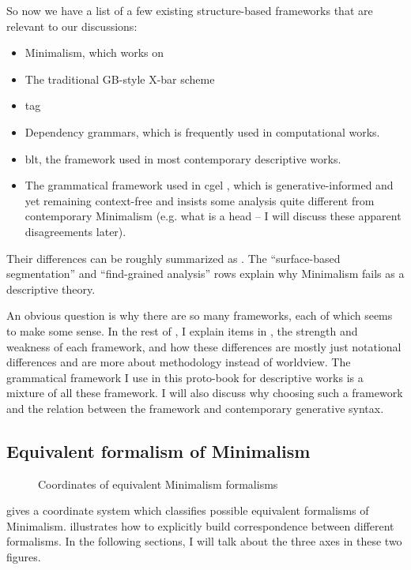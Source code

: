 \documentclass[../main.tex]{subfiles}
\begin{document}
So now we have a list of a few existing structure-based frameworks that are relevant to our discussions:
\begin{itemize}
    \item Minimalism, which works on 
    \item The traditional GB-style X-bar scheme
    \item \ac{tag}  %
    \item Dependency grammars, which is frequently used in computational works.
    \item \ac{blt}, the framework used in most contemporary descriptive works.
    \item The grammatical framework used in \ac{cgel} \citep{cgel,pullum2008expressive}, which is generative-informed and yet remaining 
    context-free and insists some analysis quite different from contemporary Minimalism (e.g. 
    what is a head -- I will discuss these apparent disagreements later).
\end{itemize}
Their differences can be roughly summarized as . 
The ``surface-based segmentation'' and ``find-grained analysis'' rows explain why Minimalism fails as a 
descriptive theory. 

An obvious question is why there are so many frameworks, each of which seems to make some sense. 
In the rest of , I explain items in , the strength and weakness 
of each framework, and how these differences
are mostly just notational differences and are more about methodology instead of worldview. The grammatical framework I use in this proto-book for 
descriptive works is a mixture of all these framework. I will also discuss why choosing such a 
framework and the relation between the framework and contemporary generative syntax.



\subsection{Equivalent formalism of Minimalism}

\begin{figure}
    \centering
    
    \caption{Coordinates of equivalent Minimalism formalisms} 
    \label{fig:coordinate-minimalism}
\end{figure}

 gives a coordinate system which classifies possible equivalent formalisms
of Minimalism.  illustrates how to explicitly build correspondence between 
different formalisms. In the following sections, I will talk about the three axes in these two figures. 
\end{document}
